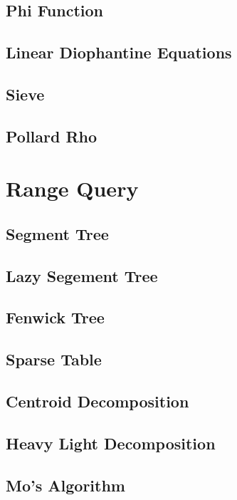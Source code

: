 \documentclass[a4paper, twocolumn]{article}
\begin{document}
\subsection{Phi Function}

\subsection{Linear Diophantine Equations}

\subsection{Sieve}

\subsection{Pollard Rho}


\section{Range Query}
\subsection{Segment Tree}

\subsection{Lazy Segement Tree}

\subsection{Fenwick Tree}

\subsection{Sparse Table}

\subsection{Centroid Decomposition}

\subsection{Heavy Light Decomposition}

\subsection{Mo's Algorithm} 

\end{document}
